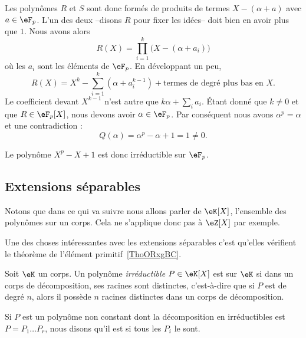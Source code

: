 \begin{example}
    Les polynômes \( R\) et \( S\) sont donc formés de produits de termes \( X-(\alpha+a)\) avec \( a\in \eF_p\). L'un des deux --disons \( R\) pour fixer les idées-- doit bien en avoir plus que \( 1\). Nous avons alors
    \begin{equation}
        R(X)=\prod_{i=1}^{k}\big( X-(\alpha+a_i) \big)
    \end{equation}
    où les \( a_i\) sont les éléments de \( \eF_p\). En développant un peu,
    \begin{equation}
        R(X)=X^k-\sum_{i=1}^k(\alpha+a_i^{k-1})+\text{termes de degré plus bas en } X.
    \end{equation}
    Le coefficient devant \( X^{k-1}\) n'est autre que \( k\alpha+\sum_ia_i\). Étant donné que \( k\neq 0\) et que \( R\in \eF_p[X]\), nous devons avoir \( \alpha\in \eF_p\). Par conséquent nous avons \( \alpha^p=\alpha\) et une contradiction :
    \begin{equation}
        Q(\alpha)=\alpha^p-\alpha+1=1\neq 0.
    \end{equation}

    Le polynôme \( X^p-X+1\) est donc irréductible sur \( \eF_p\).
\end{example}

\subsection{Extensions séparables}

Notons que dans ce qui va suivre nous allons parler de \( \eK[X]\), l'ensemble des polynômes sur un corps. Cela ne s'applique donc pas à \( \eZ[X]\) par exemple.

Une des choses intéressantes avec les extensions séparables c'est qu'elles vérifient le théorème de l'élément primitif~\ref{ThoORxgBC}.

\begin{definition}      \label{DEFooLXSBooCHIUFU}
    Soit \( \eK\) un corps. Un polynôme \emph{irréductible} \( P\in \eK[X]\) est  sur $\eK$ si dans un corps de décomposition, ses racines sont distinctes, c'est-à-dire que si \( P\) est de degré \( n\), alors il possède \( n\) racines distinctes dans un corps de décomposition.

    Si \( P\) est un polynôme non constant dont la décomposition en irréductibles est \( P=P_1\ldots P_r\), nous disons qu'il est  si tous les \( P_i\) le sont.
\end{definition}

